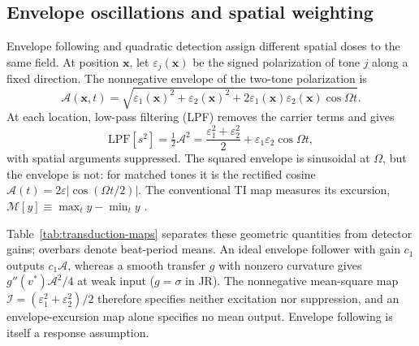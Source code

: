 \documentclass[a4paper]{article}
\newcommand{\Sig}{\sigma}
\begin{document}
\subsection{Envelope oscillations and spatial weighting}\label{sec:envelope}
Envelope following and quadratic detection assign different spatial doses
to the same field. At position $\mathbf x$, let $\varepsilon_j(\mathbf x)$ be
the signed polarization of tone $j$ along a fixed direction. The nonnegative
envelope of the two-tone polarization is
\[
\mathcal A(\mathbf x,t)=\sqrt{\varepsilon_1(\mathbf x)^2+\varepsilon_2(\mathbf x)^2
+2\varepsilon_1(\mathbf x)\varepsilon_2(\mathbf x)\cos\Omega t}.
\]
At each location, low-pass filtering (LPF) removes the carrier terms and gives
\begin{equation}
\mathrm{LPF}[s^2]=\tfrac12\mathcal A^2
=\frac{\varepsilon_1^2+\varepsilon_2^2}{2}+\varepsilon_1\varepsilon_2\cos\Omega t,
\label{eq:sqenv}
\end{equation}
with spatial arguments suppressed. The squared envelope is sinusoidal at
$\Omega$, but the envelope is not: for matched tones it is the rectified
cosine $\mathcal A(t)=2\varepsilon|\cos(\Omega t/2)|$.
The conventional TI map measures its excursion,
$\mathcal M[y]\equiv\max_t y-\min_t y$ \cite{grossman2017}.

Table~\ref{tab:transduction-maps} separates these geometric quantities from
detector gains; overbars denote beat-period means. An ideal envelope follower
with gain $c_1$ outputs $c_1\mathcal A$, whereas a smooth transfer $g$ with
nonzero curvature gives $g''(v^*)\mathcal A^2/4$ at weak input ($g=\Sig$ in JR).
The nonnegative mean-square map $\mathcal I=(\varepsilon_1^2+\varepsilon_2^2)/2$ therefore specifies neither excitation
nor suppression, and an envelope-excursion map alone specifies no mean output.
Envelope following is itself a response assumption.
\end{document}
